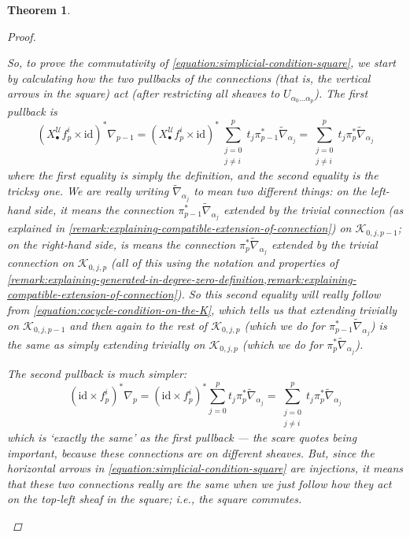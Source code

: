 \documentclass[11pt,fleqn]{article}
\theoremstyle{plain}
\newtheorem{theorem}{Theorem}[subsection]
\theoremstyle{definition}
\theoremstyle{remark}
\numberwithin{equation}{theorem}
\newcommand{\cover}{\mathcal{U}}
\newcommand{\id}{\mathrm{id}}
\newcommand{\nerve}[1]{X_{#1}^\cover}
\begin{document}
\begin{theorem}
\begin{proof}
\begin{enumerate}
                        So, to prove the commutativity of \cref{equation:simplicial-condition-square}, we start by calculating how the two pullbacks of the connections (that is, the vertical arrows in the square) act (after restricting all sheaves to $U_{\alpha_0\ldots\alpha_p}$).
                        The first pullback is
                        \begin{equation*}
                            \left(\nerve{\bullet}f_p^i\times\id\right)^*\nabla_{p-1}
                            =
                            \left(\nerve{\bullet}f_p^i\times\id\right)^* \sum_{\substack{j=0\\j\neq i}}^p t_j\pi_{p-1}^*\widetilde{\nabla}_{\alpha_j}
                            =
                            \sum_{\substack{j=0\\j\neq i}}^p t_j\pi_{p}^*\widetilde{\nabla}_{\alpha_j}
                        \end{equation*}
                        where the first equality is simply the definition, and the second equality is the tricksy one.
                        We are really writing $\widetilde{\nabla}_{\alpha_j}$ to mean two different things: on the left-hand side, it means the connection $\pi_{p-1}^*\widetilde{\nabla}_{\alpha_j}$ extended by the trivial connection (as explained in \cref{remark:explaining-compatible-extension-of-connection}) on $\mathcal{K}_{0,j,p-1}$; on the right-hand side, is means the connection $\pi_p^*\widetilde{\nabla}_{\alpha_j}$ extended by the trivial connection on $\mathcal{K}_{0,j,p}$ (all of this using the notation and properties of \cref{remark:explaining-generated-in-degree-zero-definition,remark:explaining-compatible-extension-of-connection}).
                        So this second equality will really follow from \cref{equation:cocycle-condition-on-the-K}, which tells us that extending trivially on $\mathcal{K}_{0,j,p-1}$ and then again to the rest of $\mathcal{K}_{0,j,p}$ (which we do for $\pi_{p-1}^*\widetilde{\nabla}_{\alpha_j}$) is the same as simply extending trivially on $\mathcal{K}_{0,j,p}$ (which we do for $\pi_{p}^*\widetilde{\nabla}_{\alpha_j}$).

                        The second pullback is much simpler:
                        \begin{equation*}
                            \left(\id\times f_p^i\right)^* \nabla_p
                            =
                            \left(\id\times f_p^i\right)^* \sum_{j=0}^p t_j\pi_p^*\widetilde{\nabla}_{\alpha_j}
                            =
                            \sum_{\substack{j=0\\j\neq i}}^p t_j\pi_p^*\widetilde{\nabla}_{\alpha_j}
                        \end{equation*}
                        which is `exactly the same' as the first pullback --- the scare quotes being important, because these connections are on \emph{different sheaves}.
                        But, since the horizontal arrows in \cref{equation:simplicial-condition-square} are injections, it means that these two connections really are the same when we just follow how they act on the top-left sheaf in the square; i.e., the square commutes.


\end{enumerate}
\end{proof}
\end{theorem}
\end{document}
